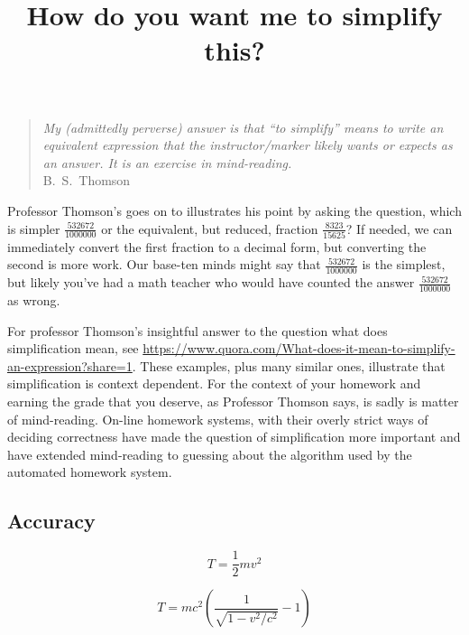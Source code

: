 \documentclass[12pt,fleqn]{article}
\title{How do you want me to simplify this?}
\begin{document}
\maketitle
\begin{quote}
\emph{My (admittedly perverse) answer is that ``to simplify''  means to write an equivalent expression that the instructor/marker likely wants or expects as an answer. It is an exercise in mind-reading.}  \\  \phantom{xxxxx} \hfill   {\mbox{\sc B.\ S.\ Thomson}}
\end{quote}
\normalsize 

Professor Thomson's goes on to  illustrates his point by asking the question, which is simpler \( \frac{532672}{1000000} \) or 
the equivalent, but reduced,  fraction \(\frac {8323}{15625} \)?  If needed, we can immediately convert the first fraction to a
decimal form, but converting the second is more work.  Our base-ten minds might say that \(\frac{532672}{1000000} \) is the simplest, but likely you've had a math teacher who would have counted the answer \( \frac{532672}{1000000} \) as wrong.  

For professor Thomson's insightful answer to the question what does simplification mean, see \url{https://www.quora.com/What-does-it-mean-to-simplify-an-expression?share=1}. These examples, plus many similar ones, illustrate that simplification is context dependent. For the context of your homework and earning the grade that you deserve, as Professor Thomson says,  is sadly is  matter of mind-reading.  On-line homework systems, with their overly strict ways of deciding correctness have made the question of simplification more important and have extended mind-reading to guessing about the algorithm used by the automated homework system.

\subsection*{Accuracy} 

\begin{equation}
    T  = \frac{1}{2} m v^2
\end{equation}

\[
    T =  m c^2 \left (\frac{1}{\sqrt{1- v^2/c^2}} - 1\right)
\]
\end{document}
